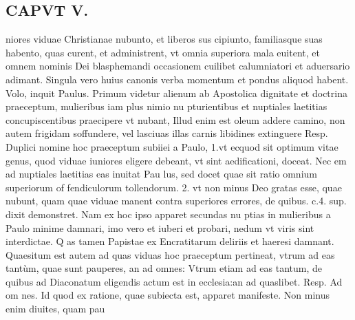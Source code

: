 \documentclass{article}
\begin{document}
\begin{pages}
\section*{CAPVT  V. }
\marginpar{[ p.297 ]}\pstart niores viduae Christianae nubunto, et liberos sus cipiunto, familiasque suas habento, quas curent, et administrent, vt omnia superiora mala euitent, et omnem nominis Dei blasphemandi occasionem cuilibet calumniatori et aduersario adimant. Singula vero huius canonis verba momentum et pondus aliquod habent. Volo, inquit Paulus. Primum videtur alienum ab Apostolica dignitate et doctrina praeceptum, mulieribus iam plus nimio nu pturientibus et nuptiales laetitias concupiscentibus praecipere vt nubant, Illud enim est oleum addere camino, non autem frigidam soffundere, vel lasciuas illas carnis libidines extinguere Resp. Duplici nomine hoc praeceptum subiiei a Paulo, 1.vt ecquod sit optimum vitae genus, quod viduae iuniores eligere debeant, vt sint aedificationi, doceat. Nec em ad nuptiales laetitias eas inuitat Pau lus, sed docet quae sit ratio omnium superiorum of fendiculorum tollendorum. 2. vt non minus Deo gratas esse, quae nubunt, quam quae viduae manent contra superiores errores, de quibus. c.4. sup. dixit demonstret. Nam ex hoc ipso apparet secundas nu ptias in mulieribus a Paulo minime damnari, imo vero et iuberi et probari, nedum vt viris sint interdictae. Q as tamen Papistae ex Encratitarum deliriis et haeresi damnant.  \pend\pstart Quaesitum est autem ad quas viduas hoc praeceptum pertineat, vtrum ad eas tantùm, quae sunt pauperes, an ad omnes: Vtrum etiam ad eas tantum, de quibus ad Diaconatum eligendis actum est in ecclesia:an ad quaslibet. Resp. Ad om nes. Id quod ex ratione, quae subiecta est, apparet manifeste. Non minus enim diuites, quam pau\pend

\end{pages}
\end{document}
